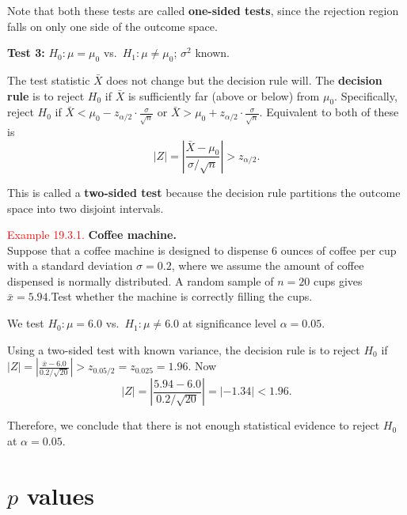 \documentclass[
]{book}
\begin{document}
Note that both these tests are called {\textbf{one-sided tests}}, since the rejection region falls on only one side of the outcome space.

\leavevmode{}%
{\textbf{Test 3:}} \(H_0: \mu = \mu_0\) vs.~\(H_1: \mu \neq \mu_0\); \(\sigma^2\) known.

The test statistic \(\bar{X}\) does not change but the decision rule will.
The {\textbf{decision rule}} is to reject \(H_0\) if \(\bar{X}\) is sufficiently far (above or below) from \(\mu_0\). Specifically, reject \(H_0\) if \(\bar{X} < \mu_0 -z_{\alpha/2} \cdot \frac{\sigma}{\sqrt{n}}\) or \(\bar{X} > \mu_0 + z_{\alpha/2} \cdot \frac{\sigma}{\sqrt{n}}\). Equivalent to both of these is
\[|Z| = \left| \frac{\bar{X}-\mu_0}{\sigma/\sqrt{n}} \right| > z_{\alpha/2}.\]

This is called a {\textbf{two-sided test}} because the decision rule partitions the outcome space into two disjoint intervals.

\leavevmode{}%
\textcolor{red}{Example 19.3.1.}
{\textbf{Coffee machine.}}\\
Suppose that a coffee machine is designed to dispense 6 ounces of coffee per cup with a standard deviation \(\sigma=0.2\), where we assume the amount of coffee dispensed is normally distributed. A random sample of \(n=20\) cups gives \(\bar{x}=5.94\).Test whether the machine is correctly filling the cups.

We test \(H_0: \mu = 6.0\) vs.~\(H_1: \mu \neq 6.0\) at significance level \(\alpha = 0.05\).

Using a two-sided test with known variance, the decision rule is to reject \(H_0\) if \(|Z| = \left| \frac{\bar{x}-6.0}{0.2/\sqrt{20}} \right| > z_{0.05/2}= z_{0.025} = 1.96\). Now\\

\[ |Z| = \left| \frac{5.94 - 6.0}{0.2/\sqrt{20}} \right| = |-1.34| < 1.96.\]

Therefore, we conclude that there is not enough statistical evidence to reject \(H_0\) at \(\alpha=0.05\).

\hfill\break

\hypertarget{Sec_Hypo_Test:p_values}{%
\section{\texorpdfstring{\(p\) values}{p values}}\label{Sec_Hypo_Test:p_values}}
\end{document}

